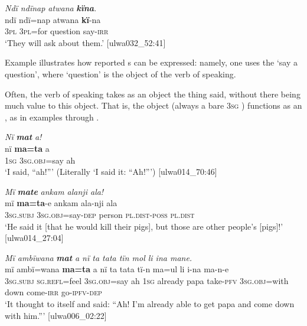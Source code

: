 \ea%
    \label{ex:syntax:186}
          \textit{Ndï ndïnap atwana} \textbf{\textit{kïna}}.\\
\gll ndï  ndï=nap  atwana    \textbf{kï}{}-na\\
    3\textsc{pl}  3\textsc{pl=}for  question  say-\textsc{irr}\\
\glt `They will ask about them.’ [ulwa032\_52:41]
\z

Example  illustrates how reported s can be expressed: namely, one uses the  ‘say a question’, where ‘question’ is the object of the verb of speaking.

  Often, the verb of speaking takes as an object the thing said, without there being much  value to this object. That is, the object (always a bare \textsc{3sg}  ) functions as an , as in examples  through .

\ea%
    \label{ex:syntax:187}
          \textit{Nï} \textbf{\textit{mat}} \textit{a!}\\
\gll    nï    \textbf{ma=ta}      a\\
    1\textsc{sg}  \textsc{3sg.obj=}say  ah\\
\glt `I said, “ah!”’ (Literally ‘I said it: “Ah!”’) [ulwa014\_70:46]
\z

\ea%
    \label{ex:syntax:188}
          \textit{Mï} \textbf{\textit{mate}} \textit{ankam alanji ala!}\\
\gll    mï      \textbf{ma=ta}{}-e      ankam  ala-nji      ala\\
    3\textsc{sg.subj}  \textsc{3sg.obj}=say-\textsc{dep}  person  \textsc{pl.dist-poss}  \textsc{pl.dist}\\
\glt `He said it [that he would kill their pigs], but those are other people’s [pigs]!’ [ulwa014\_27:04]
\z

\ea%
    \label{ex:syntax:189}
          \textit{Mï ambïwana} \textbf{\textit{mat}} \textit{a nï ta tata tïn mol li ina mane.}\\
\gll    mï      ambï=wana  \textbf{ma=ta}      a  nï    ta    tata     tï-n      ma=ul      li    i-na    ma-n-e\\
    3\textsc{sg.subj}  \textsc{sg.refl=}feel  3\textsc{sg.obj=}say  ah  1\textsc{sg}  already  papa    take-\textsc{pfv}  3\textsc{sg.obj}=with  down  come-\textsc{irr}  go-\textsc{ipfv-dep}\\
\glt `It thought to itself and said: “Ah! I’m already able to get papa and come down with him.”’ [ulwa006\_02:22]
\z

